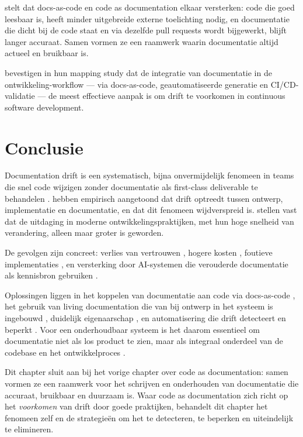 \textcite{gentle2017docslikecode} stelt dat docs-as-code en code as documentation elkaar versterken: code die goed leesbaar is, heeft minder uitgebreide externe toelichting nodig, en documentatie die dicht bij de code staat en via dezelfde pull requests wordt bijgewerkt, blijft langer accuraat. Samen vormen ze een raamwerk waarin documentatie altijd actueel en bruikbaar is.

\textcite{theunissen2022mappingdocumentation} bevestigen in hun mapping study dat de integratie van documentatie in de ontwikkeling-workflow --- via docs-as-code, geautomatiseerde generatie en CI/CD-validatie --- de meest effectieve aanpak is om drift te voorkomen in continuous software development.

\section{Conclusie}
\label{sec:drift-conclusie}

Documentation drift is een systematisch, bijna onvermijdelijk fenomeen in teams die snel code wijzigen zonder documentatie als first-class deliverable te behandelen \autocite{whiting2020drifterosion}. \textcite{romeo2024didrift} hebben empirisch aangetoond dat drift optreedt tussen ontwerp, implementatie en documentatie, en dat dit fenomeen wijdverspreid is. \textcite{theunissen2022mappingdocumentation} stellen vast dat de uitdaging in moderne ontwikkelingspraktijken, met hun hoge snelheid van verandering, alleen maar groter is geworden.

De gevolgen zijn concreet: verlies van vertrouwen \autocite{bhatti2021docsdevelopers}, hogere kosten \autocite{tripathy2014softwareevolution}, foutieve implementaties \autocite{romeo2024didrift}, en versterking door AI-systemen die verouderde documentatie als kennisbron gebruiken \autocite{theunissen2022mappingdocumentation}.

Oplossingen liggen in het koppelen van documentatie aan code via docs-as-code \autocite{gentle2017docslikecode}, het gebruik van living documentation die van bij ontwerp in het systeem is ingebouwd \autocite{martraire2019livingdocumentation}, duidelijk eigenaarschap \autocite{bhatti2021docsdevelopers}, en automatisering die drift detecteert en beperkt \autocite{romeo2024didrift}. Voor een onderhoudbaar systeem is het daarom essentieel om documentatie niet als los product te zien, maar als integraal onderdeel van de codebase en het ontwikkelproces \autocite{gentle2017docslikecode}.

Dit chapter sluit aan bij het vorige chapter over code as documentation: samen vormen ze een raamwerk voor het schrijven en onderhouden van documentatie die accuraat, bruikbaar en duurzaam is. Waar code as documentation zich richt op het \textit{voorkomen} van drift door goede praktijken, behandelt dit chapter het fenomeen zelf en de strategieën om het te detecteren, te beperken en uiteindelijk te elimineren.
